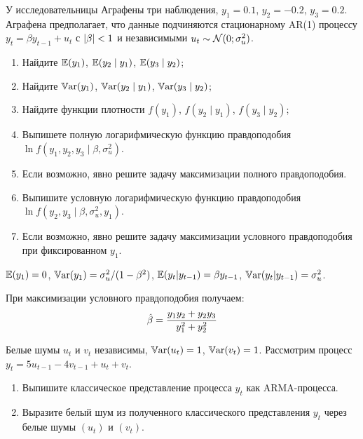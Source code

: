 \begin{problem}
  У исследовательницы Аграфены три наблюдения, $y_1 = 0.1$, $y_2 = -0.2$, $y_3 = 0.2$. 
  Аграфена предполагает, что данные подчиняются стационарному AR(1) процессу $y_t = \beta y_{t-1} + u_t$ с $\abs{\beta}<1$ и независимыми $u_t \sim \mathcal{N}(0;\sigma^2_u)$.

  \begin{enumerate}
    \item Найдите $\operatorname{\mathbb{E}}(y_1)$, $\operatorname{\mathbb{E}}(y_2 \mid y_1)$, $\operatorname{\mathbb{E}}(y_3 \mid y_2)$;
    \item Найдите $\operatorname{\mathbb{V}\mathrm{ar}}(y_1)$, $\operatorname{\mathbb{V}\mathrm{ar}}(y_2 \mid y_1)$, $\operatorname{\mathbb{V}\mathrm{ar}}(y_3 \mid y_2)$;
    \item Найдите функции плотности $f(y_1)$, $f(y_2 \mid y_1)$, $f(y_3 \mid y_2)$;
    \item Выпишете полную логарифмическую функцию правдоподобия $\ln f(y_1, y_2, y_3 \mid \beta, \sigma^2_u)$.
    \item Если возможно, явно решите задачу максимизации полного правдоподобия.
    \item Выпишите условную логарифмическую функцию правдоподобия $\ln f(y_2, y_3 \mid \beta, \sigma^2_u, y_1)$.
    \item Если возможно, явно решите задачу максимизации условного правдоподобия при фиксированном $y_1$.
  \end{enumerate}
  \begin{sol}
    $\operatorname{\mathbb{E}}(y_1)=0$, $\operatorname{\mathbb{V}\mathrm{ar}}(y_1)=\sigma^2_u/(1-\beta^2)$, $\operatorname{\mathbb{E}}(y_t|y_{t-1})=\beta y_{t-1}$, $\operatorname{\mathbb{V}\mathrm{ar}}(y_t|y_{t-1})=\sigma^2_u$.

    При максимизации условного правдоподобия получаем:
    \[
         \hat{\beta} = \frac{y_1 y_2 + y_2 y_3}{y_1^2 + y_2^2}
    \]
  \end{sol}
\end{problem}

\begin{problem}
  Белые шумы $u_t$ и $v_t$ независимы, $\operatorname{\mathbb{V}\mathrm{ar}}(u_t) = 1$, $\operatorname{\mathbb{V}\mathrm{ar}}(v_t)=1$. Рассмотрим процесс $y_t = 5u_{t-1} - 4 v_{t-1} + u_t + v_t$.

  \begin{enumerate}
    \item Выпишите классическое представление процесса $y_t$ как ARMA-процесса.
    \item Выразите белый шум из полученного классического представления $y_t$ через белые шумы $(u_t)$ и $(v_t)$.
  \end{enumerate}
  \begin{sol}
  \end{sol}
\end{problem}




